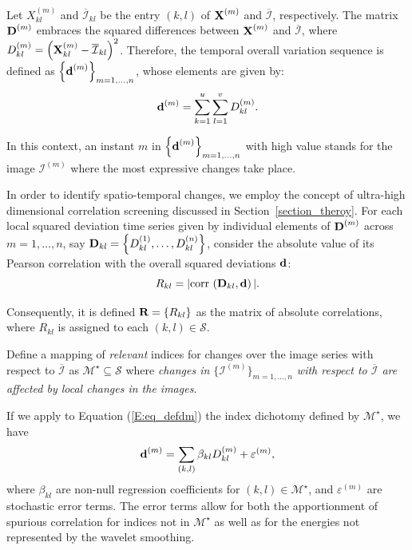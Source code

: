 \documentclass[journal]{IEEEtran}
\def\corr{\mbox{{\rm corr\,}}}
\newcommand{\vD}{{\textbf D}}
\newcommand{\vd}{{\textbf d}}
\newcommand{\vR}{{\textbf R}}
\newcommand{\vX}{{\textbf X}}
\begin{document}
Let $X_{kl}^{(m)}$ and $\overline{\mathcal{I}}_{kl}$ be the entry $(k,l)$ of $\vX^{(m)}$ and $\overline{\mathcal{I}}$, respectively. 
%
The matrix $\vD^{(m)}$ embraces the squared differences between $\vX^{(m)}$ and $\overline{\mathcal{I}}$, where $D_{kl}^{(m)} = \left( \vX_{kl}^{(m)} - \overline{\mathcal{I}}_{kl} \right)^2$.
%
Therefore, the temporal overall variation sequence is defined as $\left\lbrace \vd^{(m)}  \right\rbrace_{m=1,\ldots,n}$, whose elements are given by:
\begin{equation}\label{E:eq_defdm}
\vd^{(m)} = \sum_{k=1}^{u} \sum_{l=1}^{v} D_{kl}^{(m)}.
\end{equation}


In this context, an instant $m$ in $\left\lbrace \vd^{(m)}  \right\rbrace_{m=1,\ldots,n}$ with high value stands for the image $\mathcal{I}^{(m)}$ where the most expressive changes take place.



In order to identify spatio-temporal changes, we employ the concept of ultra-high dimensional correlation screening \cite{fan2020statistical} discussed in Section~\ref{section_theroy}. For each local squared deviation time series given by individual elements of $\vD^{(m)}$ across $m=1,\ldots,n$, say $\vD_{kl} = \left\lbrace D_{kl}^{(1)},\ldots,D_{kl}^{(n)} \right\rbrace$, consider the absolute value of its Pearson correlation with the overall squared deviations $\vd$:
\begin{equation}\label{def_Rkld}
R_{kl}= |\corr \left( \vD_{kl}, \vd \right)|.
\end{equation}

Consequently, it is defined $\vR = \{R_{kl}\}$ as the matrix of absolute correlations, where $R_{kl}$ is assigned to each $(k,l) \in \mathcal{S}$.


Define a mapping of \textit{relevant} indices for changes over the image series with respect to $\overline{\mathcal I}$ as $\mathcal{M}^{\star} \subseteq \mathcal{S}$ where \textit{changes in $\{\mathcal{I}^{(m)}\}_{m=1,\ldots,n}$ with respect to $\overline{\mathcal{I}}$ are affected by local changes in the images}.



If we apply to Equation (\ref{E:eq_defdm}) the index dichotomy defined by $\mathcal{M}^\star$, we have
\begin{align}
\vd^{(m)}=\sum_{(k,l)}\beta_{kl}D_{kl}^{(m)}+\varepsilon^{(m)}, \label{Regressao}
\end{align}
where $\beta_{kl}$ are non-null regression coefficients for $(k,l)\in\mathcal{M}^\star$, and $\varepsilon^{(m)}$ are stochastic error terms. 
The error terms allow for both the apportionment of spurious correlation for indices not in $\mathcal{M}^\star$ as well as for the energies not represented by the wavelet smoothing.
 
\end{document}
